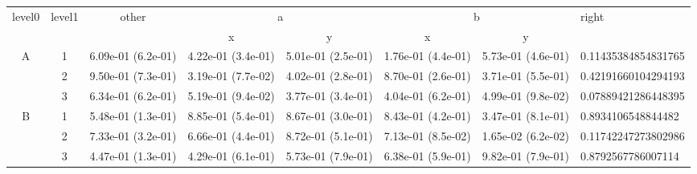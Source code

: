 \begin{tabular}{cccccccl}
\toprule
\multirow{2}{*}{level0} & \multirow{2}{*}{level1}& \multirow{2}{*}{other}&\multicolumn{2}{c}{a}&\multicolumn{2}{c}{b}& \multirow{2}{*}{right}\tabularnewline
\cmidrule(lr){4-5}
\cmidrule(lr){6-7}
&&&x&y&x&y\tabularnewline
\midrule
\multirow{3}{*}{A}&1& 6.09e-01 (6.2e-01)& 4.22e-01 (3.4e-01)& 5.01e-01 (2.5e-01)& 1.76e-01 (4.4e-01)& 5.73e-01 (4.6e-01)& 0.11435384854831765\tabularnewline
&2& 9.50e-01 (7.3e-01)& 3.19e-01 (7.7e-02)& 4.02e-01 (2.8e-01)& 8.70e-01 (2.6e-01)& 3.71e-01 (5.5e-01)& 0.42191660104294193\tabularnewline
&3& 6.34e-01 (6.2e-01)& 5.19e-01 (9.4e-02)& 3.77e-01 (3.4e-01)& 4.04e-01 (6.2e-01)& 4.99e-01 (9.8e-02)& 0.07889421286448395\tabularnewline
\midrule
\multirow{3}{*}{B}&1& 5.48e-01 (1.3e-01)& 8.85e-01 (5.4e-01)& 8.67e-01 (3.0e-01)& 8.43e-01 (4.2e-01)& 3.47e-01 (8.1e-01)& 0.8934106548844482\tabularnewline
&2& 7.33e-01 (3.2e-01)& 6.66e-01 (4.4e-01)& 8.72e-01 (5.1e-01)& 7.13e-01 (8.5e-02)& 1.65e-02 (6.2e-02)& 0.11742247273802986\tabularnewline
&3& 4.47e-01 (1.3e-01)& 4.29e-01 (6.1e-01)& 5.73e-01 (7.9e-01)& 6.38e-01 (5.9e-01)& 9.82e-01 (7.9e-01)& 0.8792567786007114\tabularnewline
\bottomrule
\end{tabular}
